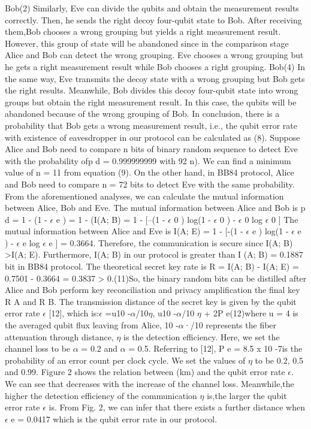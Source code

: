 Bob(2) Similarly, Eve can divide the qubits and obtain the measurement results correctly. Then, he sends the right decoy four-qubit state to Bob. After receiving them,Bob chooses a wrong grouping but yields a right measurement result. However, this group of state will be abandoned since in the comparison stage Alice and Bob can detect the wrong grouping.
Eve chooses a wrong grouping but he gets a right measurement result while Bob chooses a right grouping.
Bob(4) In the same way, Eve transmits the decoy state with a wrong grouping but Bob gets the right results. Meanwhile, Bob divides this decoy four-qubit state into wrong groups but obtain the right measurement result. In this case, the qubits will be abandoned because of the wrong grouping of Bob.
In conclusion, there is a probability that Bob gets a wrong measurement result, i.e., the qubit error rate with existence of eavesdropper in our protocol can be calculated as (8).
Suppose Alice and Bob need to compare n bits of binary random sequence to detect Eve with the probability ofp d = 0.999999999 with
92 n). We can find a minimum value of n = 11 from equation (9).
On the other hand, in BB84 protocol, Alice and Bob need to compare n = 72 bits to detect Eve with the same probability. From the aforementioned analyses, we can calculate the mutual information between Alice, Bob and Eve. The mutual information between Alice and Bob is p d = 1 - (1 - $\epsilon$ e ) = 1 - (I(A; B) = 1 - [--(1 - $\epsilon$ 0 ) log(1 - $\epsilon$ 0 ) - $\epsilon$ 0 log $\epsilon$ 0 ]
The mutual information between Alice and Eve is I(A; E) = 1 - [-(1 - $\epsilon$ e ) log(1 - $\epsilon$ e ) - $\epsilon$ e log $\epsilon$ e ] = 0.3664.
Therefore, the communication is secure since I(A; B) >I(A; E). Furthermore, I(A; B) in our protocol is greater than I (A; B) = 0.1887 bit in BB84 protocol.
The theoretical secret key rate is R = I(A; B) - I(A; E) = 0.7501 - 0.3664 = 0.3837 > 0.(11)So, the binary random bits can be distilled after Alice and Bob perform key reconciliation and privacy amplification the final key R A and R B. The transmission distance of the secret key is given by the qubit error rate $\epsilon$ [12], which is:$\epsilon$ =u10 -$\alpha$/10$\eta$, u10 -$\alpha$/10 $\eta$ + 2P e(12)where u = 4 is the averaged qubit flux leaving from Alice, 10 -$\alpha$·/10 represents the fiber attenuation through distance, $\eta$ is the detection efficiency. Here, we set the channel loss to be $\alpha$ = 0.2 and $\alpha$ = 0.5. Referring to [12], P e = 8.5 x 10 -7is the probability of an error count per clock cycle. We set the values of $\eta$ to be 0.2, 0.5 and 0.99. Figure 2 shows the relation between (km) and the qubit error rate $\epsilon$. We can see that decreases with the increase of the channel loss. Meanwhile,the higher the detection efficiency of the communication $\eta$ is,the larger the qubit error rate $\epsilon$ is. From Fig. 2, we can infer that there exists a further distance when $\epsilon$ e = 0.0417 which is the qubit error rate in our protocol.

